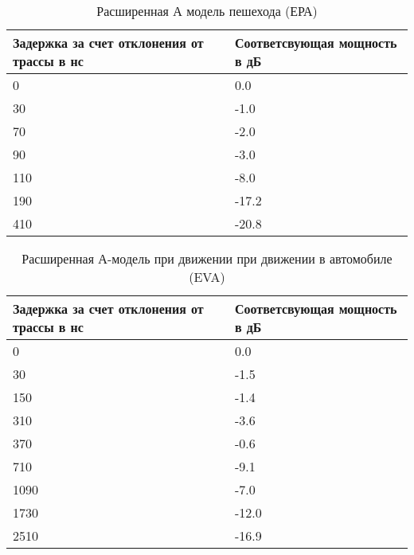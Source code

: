 \begin{table} [htb]
  \centering
\parbox{15cm}{\caption{Расширенная А модель пешехода (ЕРА) \cite{TS36104}}\label{EPA}}
\begin{tabular}{|p{7cm}|p{7cm}|}
    \hline
    \hline
    Задержка за счет отклонения от трассы в нс &  Соответсвующая мощность в дБ \\ \hline \hline
    0                                     & 0.0                           \\ \hline
    30                                    & -1.0                          \\ \hline
    70                                    & -2.0                          \\ \hline
    90                                    & -3.0                          \\ \hline
    110                                   & -8.0                          \\ \hline
    190                                   & -17.2                         \\ \hline
    410                                   & -20.8                         \\ \hline
    \end{tabular}

\end{table}

\begin{table} [htb]
  \centering
\parbox{15cm}{\caption{Расширенная А-модель при движении при движении в автомобиле (EVA) \cite{TS36104}}\label{EVA}}
\begin{tabular}{|p{7cm}|p{7cm}|}
    \hline
    \hline
    Задержка за счет отклонения от трассы в нс &  Соответсвующая мощность в дБ \\ \hline \hline
    0                                          & 0.0                           \\ \hline
    30                                         & -1.5                          \\ \hline
    150                                        & -1.4                          \\ \hline
    310                                        & -3.6                          \\ \hline
    370                                        & -0.6                          \\ \hline
    710                                        & -9.1                          \\ \hline
    1090                                       & -7.0                          \\ \hline
    1730                                       & -12.0                         \\ \hline
    2510                                       & -16.9                         \\ \hline
    \end{tabular}
\end{table}


